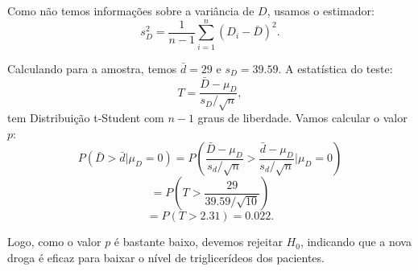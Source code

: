 \documentclass{article}
\begin{document}
Como não temos informações sobre a variância de $D$, usamos o estimador:
    $$
    s_D^2 = \frac{1}{n-1}\sum_{i=1}^n (D_i - \bar{D})^2.
    $$

Calculando para a amostra, temos $\bar{d} = 29$ e $s_D = 39.59$. A estatística do teste:
    $$
    T = \frac{\bar{D} - \mu_D}{s_D / \sqrt{n}},
    $$
tem Distribuição t-Student com $n-1$ graus de liberdade. Vamos calcular o valor $p$:
    $$
    P(\bar{D} > \bar{d}|\mu_D = 0) = P\left(\frac{\bar{D} - \mu_D}{s_d/\sqrt{n}} > \frac{\bar{d} - \mu_D}{s_d/\sqrt{n}}\bigg|\mu_D = 0\right)
    $$
    $$
    = P\left(T > \frac{29}{39.59/\sqrt{10}}\right)
    $$
    $$
    = P(T > 2.31) = 0.022.
    $$

Logo, como o valor $p$ é bastante baixo, devemos rejeitar $H_0$, indicando que a nova droga é eficaz para baixar o nível de triglicerídeos dos pacientes.
\end{document}
